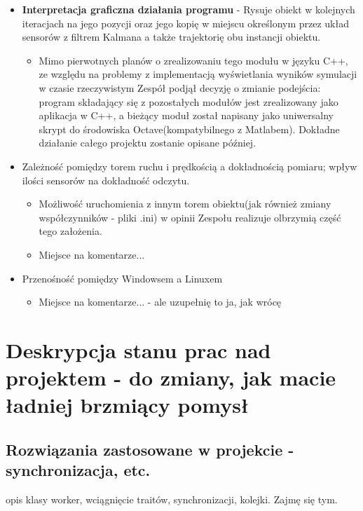 \documentclass{article}
\begin{document}
\begin{itemize}
		\item \textbf{Interpretacja graficzna działania programu} - Rysuje obiekt w kolejnych iteracjach na jego pozycji oraz jego kopię w miejscu określonym przez układ sensorów z filtrem Kalmana a także trajektorię obu instancji obiektu.
			\begin{itemize}
				\item Mimo pierwotnych planów o zrealizowaniu tego modułu w języku C++, ze względu na problemy z implementacją wyświetlania wyników symulacji w czasie rzeczywistym Zespół podjął decyzję o zmianie podejścia: program składający się z pozostałych modułów jest zrealizowany jako aplikacja w C++, a bieżący moduł został napisany jako uniwersalny skrypt do środowiska Octave(kompatybilnego z Matlabem). Dokładne działanie całego projektu zostanie opisane później.
			\end{itemize}
			
		\item Zależność pomiędzy torem ruchu i prędkością a dokładnością pomiaru; wpływ ilości sensorów na dokładność odczytu. 
			\begin{itemize}
				\item Możliwość uruchomienia z innym torem obiektu(jak również zmiany współczynników - pliki .ini) w opinii Zespołu realizuje olbrzymią część tego założenia.
				\item Miejsce na komentarze... 
			\end{itemize}
		\item Przenośność pomiędzy Windowsem a Linuxem
			\begin{itemize}
				\item Miejsce na komentarze... - ale uzupełnię to ja, jak wrócę
			\end{itemize}
				
		\end{itemize}		
	
	\section{Deskrypcja stanu prac nad projektem - do zmiany, jak macie ładniej brzmiący pomysł}
	
	\subsection{Rozwiązania zastosowane w projekcie - synchronizacja, etc.}
		opis klasy worker, wciągnięcie traitów, synchronizacji, kolejki. Zajmę się tym.
\end{document}
